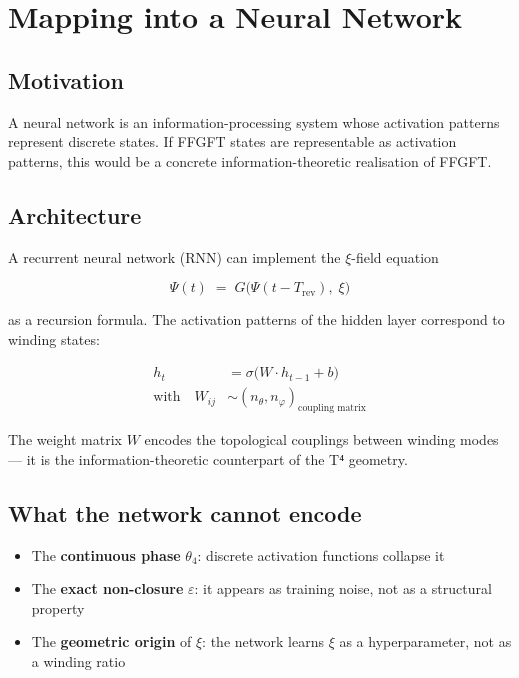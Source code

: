 \section{Mapping into a Neural Network}

\subsection{Motivation}

A neural network is an information-processing system whose activation
patterns represent discrete states. If FFGFT states are representable
as activation patterns, this would be a concrete information-theoretic
realisation of FFGFT.

\subsection{Architecture}

A recurrent neural network (RNN) can implement the $\xi$-field equation

\begin{equation}
  \Psi(t) \;=\; G\bigl(\Psi(t - T_\text{rev}),\; \xi\bigr)
  \tag{243.4}
\end{equation}

as a recursion formula. The activation patterns of the hidden layer
correspond to winding states:

\begin{align}
  h_t &= \sigma\bigl(W \cdot h_{t-1} + b\bigr) \tag{243.5} \\
  \text{with}\quad W_{ij} &\sim (n_\theta, n_\varphi)_\text{coupling matrix}
  \tag{243.6}
\end{align}

The weight matrix $W$ encodes the topological couplings between winding
modes --- it is the information-theoretic counterpart of the T⁴ geometry.

\subsection{What the network cannot encode}

\begin{itemize}
  \item The \textbf{continuous phase} $\theta_4$: discrete activation
        functions collapse it
  \item The \textbf{exact non-closure} $\varepsilon$: it appears as
        training noise, not as a structural property
  \item The \textbf{geometric origin} of $\xi$: the network learns $\xi$
        as a hyperparameter, not as a winding ratio
\end{itemize}

